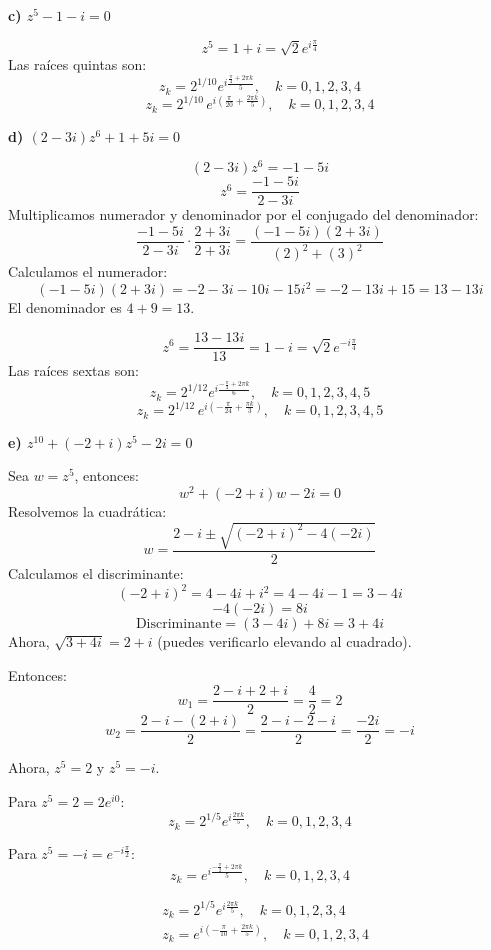 \begin{prob}
\begin{myproof}
\textbf{c) $z^5 - 1 - i = 0$}

\[
z^5 = 1 + i = \sqrt{2} e^{i\frac{\pi}{4}}
\]
Las raíces quintas son:
\[
z_k = 2^{1/10} e^{i \frac{\frac{\pi}{4} + 2\pi k}{5}}, \quad k=0,1,2,3,4
\]
\[
\boxed{
z_k = 2^{1/10} \, e^{i\left( \frac{\pi}{20} + \frac{2\pi k}{5} \right ) }, \quad k=0,1,2,3,4
}
\]

\vspace{1em}

\textbf{d) $(2-3i)z^6 + 1 + 5i = 0$}

\[
(2-3i)z^6 = -1 - 5i
\]
\[
z^6 = \frac{-1 - 5i}{2 - 3i}
\]
Multiplicamos numerador y denominador por el conjugado del denominador:
\[
\frac{-1 - 5i}{2 - 3i} \cdot \frac{2 + 3i}{2 + 3i} = \frac{(-1 - 5i)(2 + 3i)}{(2)^2 + (3)^2}
\]
Calculamos el numerador:
\[
(-1 - 5i)(2 + 3i) = -2 - 3i - 10i - 15i^2 = -2 - 13i + 15 = 13 - 13i
\]
El denominador es $4 + 9 = 13$.

\[
z^6 = \frac{13 - 13i}{13} = 1 - i = \sqrt{2} e^{-i\frac{\pi}{4}}
\]
Las raíces sextas son:
\[
z_k = 2^{1/12} e^{i \frac{ -\frac{\pi}{4} + 2\pi k }{6}}, \quad k=0,1,2,3,4,5
\]
\[
\boxed{
z_k = 2^{1/12} \, e^{i\left( -\frac{\pi}{24} + \frac{\pi k}{3} \right ) }, \quad k=0,1,2,3,4,5
}
\]

\vspace{1em}

\textbf{e) $z^{10} + (-2 + i)z^5 - 2i = 0$}

Sea $w = z^5$, entonces:
\[
w^2 + (-2 + i)w - 2i = 0
\]
Resolvemos la cuadrática:
\[
w = \frac{2 - i \pm \sqrt{(-2 + i)^2 - 4(-2i)}}{2}
\]
Calculamos el discriminante:
\[
(-2 + i)^2 = 4 - 4i + i^2 = 4 - 4i - 1 = 3 - 4i
\]
\[
-4(-2i) = 8i
\]
\[
\text{Discriminante} = (3 - 4i) + 8i = 3 + 4i
\]
Ahora, $\sqrt{3 + 4i} = 2 + i$ (puedes verificarlo elevando al cuadrado).

Entonces:
\[
w_1 = \frac{2 - i + 2 + i}{2} = \frac{4}{2} = 2
\]
\[
w_2 = \frac{2 - i - (2 + i)}{2} = \frac{2 - i - 2 - i}{2} = \frac{-2i}{2} = -i
\]

Ahora, $z^5 = 2$ y $z^5 = -i$.

Para $z^5 = 2 = 2 e^{i0}$:
\[
z_k = 2^{1/5} e^{i \frac{2\pi k}{5}}, \quad k=0,1,2,3,4
\]

Para $z^5 = -i = e^{-i\frac{\pi}{2}}$:
\[
z_k = e^{i \frac{ -\frac{\pi}{2} + 2\pi k }{5 } }, \quad k=0,1,2,3,4
\]

\[
\boxed{
\begin{aligned}
&z_k = 2^{1/5} e^{i \frac{2\pi k}{5}}, \quad k=0,1,2,3,4 \\
&z_k = e^{i \left( -\frac{\pi}{10} + \frac{2\pi k}{5} \right ) }, \quad k=0,1,2,3,4
\end{aligned}
}
\]

\end{myproof}

\end{prob}

